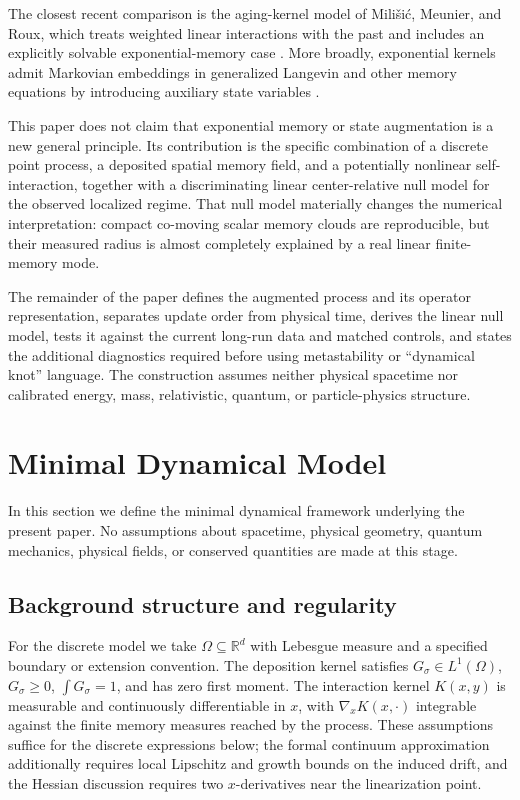 \documentclass[reprint,amsmath,amssymb,aps,prd,nofootinbib,floatfix]{revtex4-2}
\begin{document}
The closest recent comparison is the aging-kernel model of Mili\v{s}i\'c,
Meunier, and Roux, which treats weighted linear interactions with the past and
includes an explicitly solvable exponential-memory case
\cite{MilisicMeunierRoux2026}.
More broadly, exponential kernels admit Markovian embeddings in generalized
Langevin and other memory equations by introducing auxiliary state variables
\cite{Mori1965,Zwanzig2001,JaganathanValani2025,
WisniewskiLuczkaSpiechowicz2024}.

This paper does not claim that exponential memory or state augmentation is a
new general principle.
Its contribution is the specific combination of a discrete point process, a
deposited spatial memory field, and a potentially nonlinear self-interaction,
together with a discriminating linear center-relative null model for the
observed localized regime.
That null model materially changes the numerical interpretation: compact
co-moving scalar memory clouds are reproducible, but their measured radius is
almost completely explained by a real linear finite-memory mode.

The remainder of the paper defines the augmented process and its operator
representation, separates update order from physical time, derives the linear
null model, tests it against the current long-run data and matched controls,
and states the additional diagnostics required before using metastability or
``dynamical knot'' language.
The construction assumes neither physical spacetime nor calibrated energy,
mass, relativistic, quantum, or particle-physics structure.
\section{Minimal Dynamical Model}\label{sec:MinDynModel}

In this section we define the minimal dynamical framework underlying the present paper.
No assumptions about spacetime, physical geometry, quantum mechanics, physical fields, or conserved quantities are made at this stage.

\subsection{Background structure and regularity}\label{sec:background_invariances}

For the discrete model we take $\Omega\subseteq\mathbb{R}^d$ with Lebesgue
measure and a specified boundary or extension convention.
The deposition kernel satisfies $G_\sigma\in L^1(\Omega)$,
$G_\sigma\geq0$, $\int G_\sigma=1$, and has zero first moment.
The interaction kernel $K(x,y)$ is measurable and continuously
differentiable in $x$, with $\nabla_xK(x,\cdot)$ integrable against the finite
memory measures reached by the process.
These assumptions suffice for the discrete expressions below; the formal
continuum approximation additionally requires local Lipschitz and growth
bounds on the induced drift, and the Hessian discussion requires two
$x$-derivatives near the linearization point.
\end{document}
